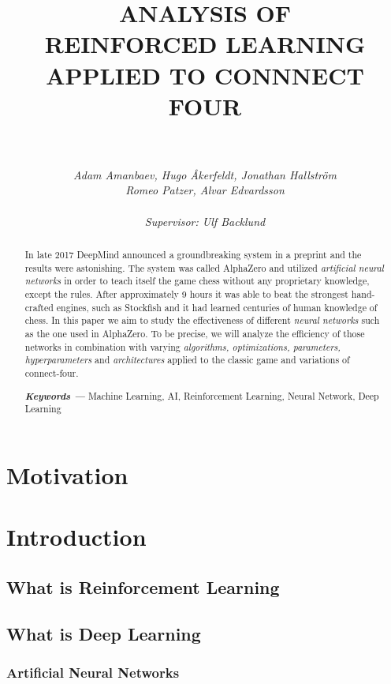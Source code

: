 \documentclass[titlepage]{article}
\title{\textbf{ANALYSIS OF \\REINFORCED LEARNING \\APPLIED TO CONNNECT FOUR}}
\author{\rule{8cm}{0.3mm} \\[0.5in] \textit{Adam Amanbaev, Hugo Åkerfeldt, Jonathan Hallström} \\ \textit{Romeo Patzer, Alvar Edvardsson} \\\\
    \small \textit{Supervisor: Ulf Backlund}
}
\date{}
\providecommand{\keywords}[1] {
    \small
    \textbf{\textit{Keywords ---}} #1
}
\begin{document}
\maketitle

\newpage

\begin{abstract}
    In late 2017 DeepMind announced a groundbreaking system in a preprint \cite{alphazero} and the results were astonishing. The system was called AlphaZero and utilized \emph{artificial neural networks} in order to teach itself the game chess without any proprietary knowledge, except the rules. After approximately 9 hours it was able to beat the strongest hand-crafted engines, such as Stockfish and it had learned centuries of human knowledge of chess. In this paper we aim to study the effectiveness of different \emph{neural networks} such as the one used in AlphaZero. To be precise, we will analyze the efficiency of those networks in combination with varying \emph{algorithms, optimizations, parameters, hyperparameters} and \emph {architectures} applied to the classic game and variations of connect-four. \\[0.5in]
\centerline{\keywords{Machine Learning, AI, Reinforcement Learning, Neural Network, Deep Learning}}
\end{abstract}

\tableofcontents

\newpage

\section{Motivation}

\newpage

\section{Introduction}

\subsection{What is Reinforcement Learning}
\subsection{What is Deep Learning}
\subsubsection{Artificial Neural Networks}
\end{document}
